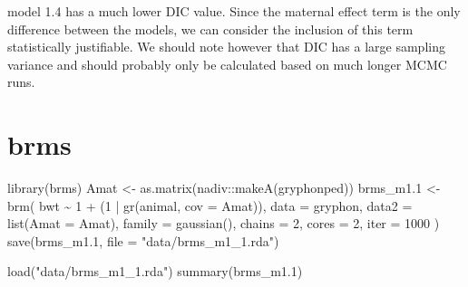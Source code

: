 \documentclass[
  12pt,
]{book}
\newenvironment{Shaded}{\begin{snugshade}}{\end{snugshade}}
\newcommand{\AttributeTok}[1]{\textcolor[rgb]{0.77,0.63,0.00}{#1}}
\newcommand{\DecValTok}[1]{\textcolor[rgb]{0.00,0.00,0.81}{#1}}
\newcommand{\FloatTok}[1]{\textcolor[rgb]{0.00,0.00,0.81}{#1}}
\newcommand{\FunctionTok}[1]{\textcolor[rgb]{0.00,0.00,0.00}{#1}}
\newcommand{\NormalTok}[1]{#1}
\newcommand{\OtherTok}[1]{\textcolor[rgb]{0.56,0.35,0.01}{#1}}
\newcommand{\SpecialCharTok}[1]{\textcolor[rgb]{0.00,0.00,0.00}{#1}}
\newcommand{\StringTok}[1]{\textcolor[rgb]{0.31,0.60,0.02}{#1}}
\begin{document}
model 1.4 has a much lower DIC value. Since the maternal effect term is the only difference between the models, we can consider the inclusion of this term statistically justifiable. We should note however that DIC has a large sampling variance and should probably only be calculated based on much longer MCMC runs.

\hypertarget{brms-1}{%
\section{brms}\label{brms-1}}

\begin{Shaded}
\begin{Highlighting}[]
\FunctionTok{library}\NormalTok{(brms)}
\NormalTok{Amat }\OtherTok{\textless{}{-}} \FunctionTok{as.matrix}\NormalTok{(nadiv}\SpecialCharTok{::}\FunctionTok{makeA}\NormalTok{(gryphonped))}
\NormalTok{brms\_m1}\FloatTok{.1} \OtherTok{\textless{}{-}} \FunctionTok{brm}\NormalTok{(}
\NormalTok{  bwt }\SpecialCharTok{\textasciitilde{}} \DecValTok{1} \SpecialCharTok{+}\NormalTok{ (}\DecValTok{1} \SpecialCharTok{|} \FunctionTok{gr}\NormalTok{(animal, }\AttributeTok{cov =}\NormalTok{ Amat)),}
  \AttributeTok{data =}\NormalTok{ gryphon,}
  \AttributeTok{data2 =} \FunctionTok{list}\NormalTok{(}\AttributeTok{Amat =}\NormalTok{ Amat),}
  \AttributeTok{family =} \FunctionTok{gaussian}\NormalTok{(),}
  \AttributeTok{chains =} \DecValTok{2}\NormalTok{, }\AttributeTok{cores =} \DecValTok{2}\NormalTok{, }\AttributeTok{iter =} \DecValTok{1000}
\NormalTok{)}
\FunctionTok{save}\NormalTok{(brms\_m1}\FloatTok{.1}\NormalTok{, }\AttributeTok{file =} \StringTok{"data/brms\_m1\_1.rda"}\NormalTok{)}
\end{Highlighting}
\end{Shaded}

\begin{Shaded}
\begin{Highlighting}[]
\FunctionTok{load}\NormalTok{(}\StringTok{"data/brms\_m1\_1.rda"}\NormalTok{)}
\FunctionTok{summary}\NormalTok{(brms\_m1}\FloatTok{.1}\NormalTok{)}
\end{Highlighting}
\end{Shaded}
\end{document}
